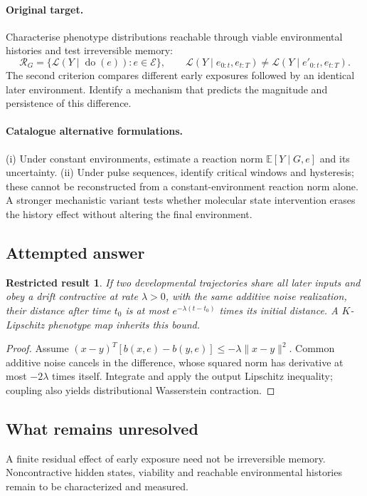 \documentclass[11pt]{article}
\newcommand{\E}{\mathbb E}
\providecommand{\E}{\mathbb E}
\newtheorem{attemptresult}{Restricted result}[section]
\begin{document}
\paragraph{Original target.}
Characterise phenotype distributions reachable through viable environmental histories and test irreversible memory:
\[
\mathcal R_G=\{\mathcal L(Y\mid\operatorname{do}(e)):e\in\mathcal E\},
\qquad
\mathcal L(Y\mid e_{0:t},e_{t:T})\neq\mathcal L(Y\mid e'_{0:t},e_{t:T}).
\]
The second criterion compares different early exposures followed by an identical later environment. Identify a mechanism that predicts the magnitude and persistence of this difference.
\paragraph{Catalogue alternative formulations.}
(i) Under constant environments, estimate a reaction norm $\E[Y\mid G,e]$ and its uncertainty. (ii) Under pulse sequences, identify critical windows and hysteresis; these cannot be reconstructed from a constant-environment reaction norm alone. A stronger mechanistic variant tests whether molecular state intervention erases the history effect without altering the final environment.
\subsection{Attempted answer}
\begin{attemptresult}
If two developmental trajectories share all later inputs and obey a drift contractive at rate $\lambda>0$, with the same additive noise realization, their distance after time $t_0$ is at most $e^{-\lambda(t-t_0)}$ times its initial distance. A $K$-Lipschitz phenotype map inherits this bound.
\end{attemptresult}
\begin{proof}
Assume $(x-y)^T[b(x,e)-b(y,e)]\leq-\lambda\|x-y\|^2$. Common additive noise cancels in the difference, whose squared norm has derivative at most $-2\lambda$ times itself. Integrate and apply the output Lipschitz inequality; coupling also yields distributional Wasserstein contraction.
\end{proof}
\subsection{What remains unresolved}
A finite residual effect of early exposure need not be irreversible memory. Noncontractive hidden states, viability and reachable environmental histories remain to be characterized and measured.
\end{document}
